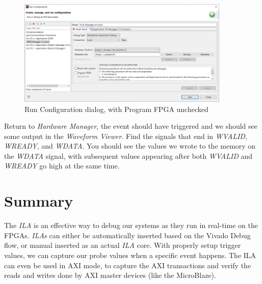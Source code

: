 \documentclass[11pt]{article}
\begin{document}
\begin{figure}[!h]
    \centering
    \includegraphics[width=0.9\textwidth]{images/run_config_program.png}
    \caption{Run Configuration dialog, with Program FPGA unchecked}
    \label{fig:run_config_program}
\end{figure}

Return to \textit{Hardware Manager}, the event should have triggered and we should see some output in the \textit{Waveform Viewer}. Find the signals that end in \textit{WVALID}, \textit{WREADY}, and \textit{WDATA}. You should see the values we wrote to the memory on the \textit{WDATA} signal, with subsequent values appearing after both \textit{WVALID} and \textit{WREADY} go high at the same time. 




\section{Summary}
\label{sec:summary}
The \textit{ILA} is an effective way to debug our systems as they run in real-time on the FPGAs. \textit{ILAs} can either be automatically inserted based on the Vivado Debug flow, or manual inserted as an actual \textit{ILA} core. With properly setup trigger values, we can capture our probe values when a specific event happens. The ILA can even be used in AXI mode, to capture the AXI transactions and verify the reads and writes done by AXI master devices (like the MicroBlaze).




\newpage
\printbibliography
\end{document}
